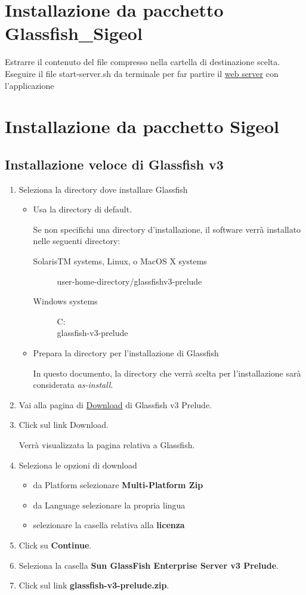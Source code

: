 \documentclass[11pt,a4paper]{article}
\begin{document}
\section{Installazione da pacchetto Glassfish\_Sigeol}
Estrarre il contenuto del file compresso nella cartella di destinazione scelta.
Eseguire il file start-server.sh da terminale per far partire il \underline{web server} con l'applicazione

\section{Installazione da pacchetto Sigeol}
\subsection{Installazione veloce di Glassfish v3}
\begin{enumerate}
 \item Seleziona la directory dove installare Glassfish
\begin{itemize}
 \item Usa la directory di default.

Se non specifichi una directory d'installazione, il software verrà installato nelle seguenti directory:
\begin{description}
 \item[SolarisTM systems, Linux, o MacOS X systems] 

user-home-directory/glassfishv3-prelude
\item[Windows systems] 

C:\\glassfish-v3-prelude
 \end{description}
\item Prepara la directory per l'installazione di Glassfish

In questo documento, la directory che verrà scelta per l'installazione sarà considerata \textit{as-install}.
\end{itemize}
\item Vai alla pagina di \href{http://www.sun.com/software/products/glassfishv3_prelude/get.jsp}{Download}  di Glassfish v3 Prelude.
\item Click sul link Download. 

Verrà visualizzata la pagina relativa a Glassfish.
\item Seleziona le opzioni di download
\begin{itemize}
 \item da Platform selezionare \textbf{Multi-Platform Zip}
 \item da Language selezionare la propria lingua
 \item selezionare la casella relativa alla \textbf{licenza}
\end{itemize}
\item Click su \textbf{Continue}.
\item Seleziona la casella \textbf{Sun GlassFish Enterprise Server v3 Prelude}.
\item Click sul link \textbf{glassfish-v3-prelude.zip}.


\end{enumerate}
\end{document}
